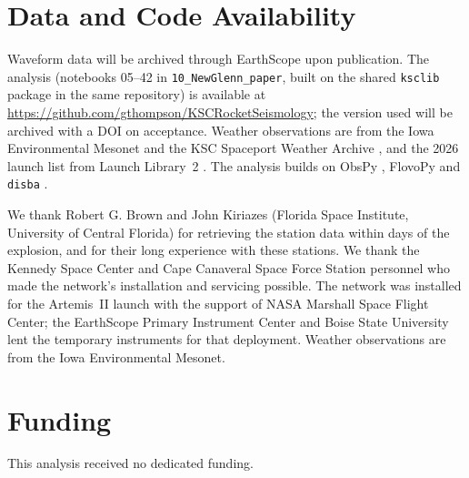 \documentclass[]{seismica}
\begin{document}
\section*{Data and Code Availability}

Waveform data will be archived through EarthScope upon publication.
The analysis (notebooks 05--42 in \texttt{10\_NewGlenn\_paper}, built on
the shared \texttt{ksclib} package in the same repository) is available
at \url{https://github.com/gthompson/KSCRocketSeismology}; the version used will be archived with a DOI on
acceptance. Weather observations
are from the Iowa Environmental Mesonet \citep{iem_asos} and the KSC
Spaceport Weather Archive \citep{ksc_wxarchive}, and the 2026
launch list from Launch Library~2 \citep{launchlibrary2}. The analysis
builds on ObsPy \citep{Beyreuther2010,krischer_obspy_2015}, FlovoPy
\citep{flovopy_2026} and \texttt{disba} \citep{luu2021disba}.

\begin{acknowledgements}
We thank Robert G. Brown and John Kiriazes (Florida Space Institute, University of Central Florida) for
retrieving the station data within days of the explosion, and for their long experience with these stations.
We thank the Kennedy Space Center and Cape Canaveral Space Force Station personnel who made the network's
installation and servicing possible. The network was installed for the Artemis~II launch with the support of
NASA Marshall Space Flight Center; the EarthScope Primary Instrument Center and Boise State University lent the
temporary instruments for that deployment. Weather observations are from the Iowa Environmental Mesonet.
\end{acknowledgements}

\section*{Funding}

This analysis received no dedicated funding.


\end{document}
